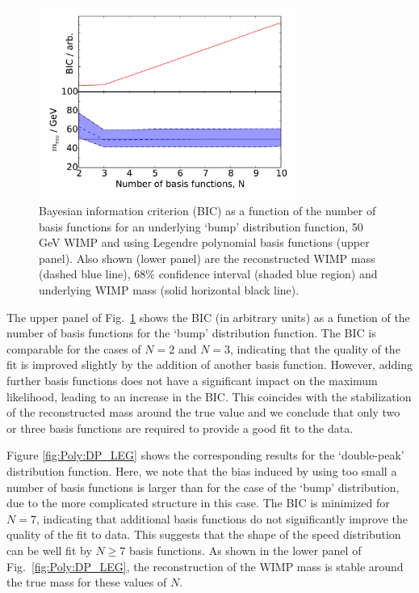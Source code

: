 \begin{figure}[t]
\centering
  \includegraphics[width=0.75\textwidth]{Poly/VaryingN_BUMP_LEG.pdf}
  \caption{Bayesian information criterion (BIC) as a function of the number of basis functions for an underlying `bump' distribution function, 50 GeV WIMP and using Legendre polynomial basis functions (upper panel). Also shown (lower panel) are the reconstructed WIMP mass (dashed blue line), 68\% confidence interval (shaded blue region) and underlying WIMP mass (solid horizontal black line).}
  \label{fig:Poly:BUMP_LEG}
\end{figure}

The upper panel of Fig.~\ref{fig:Poly:BUMP_LEG} shows the BIC (in arbitrary units) as a function of the number of basis functions for the `bump' distribution function. The BIC is comparable for the cases of $N=2$ and $N=3$, indicating that the quality of the fit is improved slightly by the addition of another basis function. However, adding further basis functions does not have a significant impact on the maximum likelihood, leading to an increase in the BIC. This coincides with the stabilization of the reconstructed mass around the true value and we conclude that only two or three basis functions are required to provide a good fit to the data.

Figure \ref{fig:Poly:DP_LEG} shows the corresponding results for the `double-peak' distribution function. Here, we note that the bias induced by using too small a number of basis functions is larger than for the case of the `bump' distribution, due to the more complicated structure in this case. The BIC is minimized for $N=7$, indicating that additional basis functions do not significantly improve the quality of the fit to data. This suggests that the shape of the speed distribution can be well fit by $N\geq7$ basis functions. As shown in the lower panel of Fig.~\ref{fig:Poly:DP_LEG}, the reconstruction of the WIMP mass is stable around the true mass for these values of $N$.

